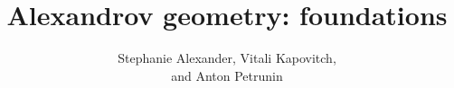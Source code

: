 \frontmatter
\title{Alexandrov geometry: foundations}
\date{}
\author{Stephanie Alexander, Vitali Kapovitch,\\ and Anton Petrunin}
\maketitle
